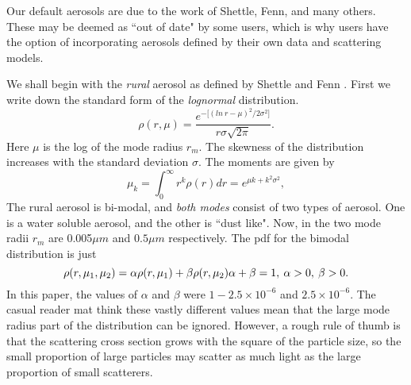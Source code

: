 \documentclass[12pt]{article}
\begin{document}
Our default aerosols are due to the work of Shettle, Fenn, and many others. These may be deemed as ``out of date"
 by some users, which is why users have the option of incorporating aerosols defined
 by their own data and scattering models.

We shall begin with the {\it rural} aerosol as defined by Shettle and Fenn \cite{ShettleFenn:Mybib}. First we write down
the standard form of the {\it lognormal} distribution.
\begin{equation}
\rho(r,\mu)=\frac{ e^{-\lbrack (ln \> r-\mu)^2/2 \sigma^2 \rbrack} }{ r \sigma \sqrt{2 \pi}}.
\end{equation}
Here $\mu$ is the log of the mode radius $r_m$. The skewness of the distribution
 increases with the standard deviation $\sigma$.
The moments are given by
\begin{equation}
\mu_k= \int_0^\infty r^k \rho(r) dr=e^{\mu k +k^2 \sigma^2},
\end{equation}
The rural aerosol is bi-modal, and {\it both modes} consist of two types of aerosol. One is a water
soluble aerosol, and the other is ``dust like".
 Now, in \cite{ShettleFenn:Mybib} the two mode radii $r_m$ are 0.005$\mu m$
and $0.5 \mu m$ respectively. The pdf for the bimodal distribution is just
\begin{equation}
\rho(r,\mu_1, \mu_2)=\alpha \rho(r, \mu_1)+\beta \rho(r, \mu_2)
$$   $$
\alpha+\beta=1, \> \alpha >0,  \> \beta >0.
\end{equation}
In this paper, the values of $\alpha$ and $\beta$ were $1-2.5 \times 10^{-6}$ and $2.5 \times 10^{-6}$.
The casual reader mat think these vastly different values mean that the large mode radius part
of the distribution can be ignored. However, a rough rule of thumb is that the scattering cross
section grows with the square of the particle size, so the small proportion of large particles may 
scatter as much light as the large proportion of small scatterers.
\end{document}
